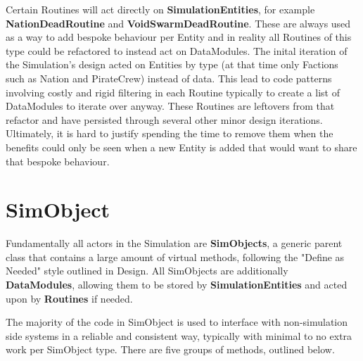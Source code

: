 \documentclass{report}
\begin{document}
Certain Routines will act directly on \textbf{SimulationEntities}, for example \textbf{NationDeadRoutine} and \textbf{VoidSwarmDeadRoutine}. These are always used as a way to add bespoke behaviour per Entity and in reality all Routines of this type could be refactored to instead act on DataModules. The inital iteration of the Simulation's design acted on Entities by type (at that time only Factions such as Nation and PirateCrew) instead of data. This lead to code patterns involving costly and rigid filtering in each Routine typically to create a list of DataModules to iterate over anyway. These Routines are leftovers from that refactor and have persisted through several other minor design iterations. Ultimately, it is hard to justify spending the time to remove them when the benefits could only be seen when a new Entity is added that would want to share that bespoke behaviour.

\section{SimObject}

Fundamentally all actors in the Simulation are \textbf{SimObjects}, a generic parent class that contains a large amount of virtual methods, following the "Define as Needed" style outlined in Design. All SimObjects are additionally \textbf{DataModules}, allowing them to be stored by \textbf{SimulationEntities} and acted upon by \textbf{Routines} if needed. 

The majority of the code in SimObject is used to interface with non-simulation side systems in a reliable and consistent way, typically with minimal to no extra work per SimObject type. There are five groups of methods, outlined below.
\end{document}
